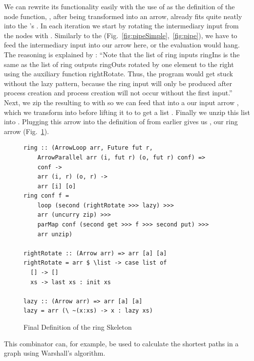 We can rewrite its functionality easily with the use of  as the definition of the node function, , after being transformed into an arrow, already fits quite neatly into the 's . In each iteration we start by rotating the intermediary input from the nodes \inlinecode{[fut r]} with . Similarly to the  (Fig.~\ref{fig:pipeSimple},~\ref{fig:pipe}), we have to feed the intermediary input into our  arrow here, or the evaluation would hang. The reasoning is explained by \citet{Loogen2012}:
\enquote{Note that the list of ring inputs ringIns is the same as the list of ring outputs ringOuts rotated by one element to the right using the auxiliary function rightRotate. Thus, the program would get stuck without the lazy pattern, because the ring input will only be produced after process creation and process creation will not occur without the first input.}
Next, we zip the resulting \inlinecode{([i], [fut r])} to \inlinecode{[(i, fut r)]} with  so we can feed that into a our input arrow , which we transform into  before lifting it to  to get a list \inlinecode{[(o, fut r)]}. Finally we unzip this list into \inlinecode{([o], [fut r])}. Plugging this arrow  into the definition of  from earlier gives us , our ring arrow (Fig.~\ref{fig:ringFinal}).
\begin{figure}[h]
\begin{lstlisting}[frame=htrbl]
ring :: (ArrowLoop arr, Future fut r,
	ArrowParallel arr (i, fut r) (o, fut r) conf) =>
    conf ->
    arr (i, r) (o, r) ->
    arr [i] [o]
ring conf f =
	loop (second (rightRotate >>> lazy) >>>
    arr (uncurry zip) >>>
    parMap conf (second get >>> f >>> second put) >>>
    arr unzip)

rightRotate :: (Arrow arr) => arr [a] [a]
rightRotate = arr $ \list -> case list of 
  [] -> []
  xs -> last xs : init xs

lazy :: (Arrow arr) => arr [a] [a]
lazy = arr (\ ~(x:xs) -> x : lazy xs)
\end{lstlisting}
\caption{Final Definition of the ring Skeleton}
\label{fig:ringFinal}
\end{figure}
This combinator can, for example, be used to calculate the shortest paths in a graph using Warshall's algorithm. 
